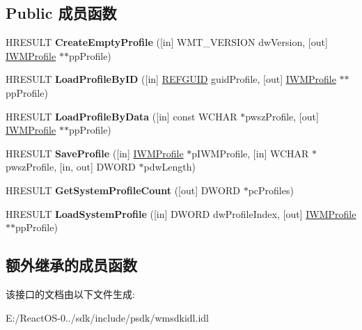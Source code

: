 \subsection*{Public 成员函数}
\begin{DoxyCompactItemize}
\item 
\mbox{\label{interface_i_w_m_profile_manager_a41ca665150d61ad72b4d442322cdad3a}} 
H\+R\+E\+S\+U\+LT {\bfseries Create\+Empty\+Profile} (\mbox{[}in\mbox{]} W\+M\+T\+\_\+\+V\+E\+R\+S\+I\+ON dw\+Version, \mbox{[}out\mbox{]} \hyperlink{interface_i_w_m_profile}{I\+W\+M\+Profile} $\ast$$\ast$pp\+Profile)
\item 
\mbox{\label{interface_i_w_m_profile_manager_add40417b8d48e9f634513dd1c2651208}} 
H\+R\+E\+S\+U\+LT {\bfseries Load\+Profile\+By\+ID} (\mbox{[}in\mbox{]} \hyperlink{struct___g_u_i_d}{R\+E\+F\+G\+U\+ID} guid\+Profile, \mbox{[}out\mbox{]} \hyperlink{interface_i_w_m_profile}{I\+W\+M\+Profile} $\ast$$\ast$pp\+Profile)
\item 
\mbox{\label{interface_i_w_m_profile_manager_a225f53283f97b715ba00a0b001d64abe}} 
H\+R\+E\+S\+U\+LT {\bfseries Load\+Profile\+By\+Data} (\mbox{[}in\mbox{]} const W\+C\+H\+AR $\ast$pwsz\+Profile, \mbox{[}out\mbox{]} \hyperlink{interface_i_w_m_profile}{I\+W\+M\+Profile} $\ast$$\ast$pp\+Profile)
\item 
\mbox{\label{interface_i_w_m_profile_manager_adefabb29481e7e334b9cd97396094dd6}} 
H\+R\+E\+S\+U\+LT {\bfseries Save\+Profile} (\mbox{[}in\mbox{]} \hyperlink{interface_i_w_m_profile}{I\+W\+M\+Profile} $\ast$p\+I\+W\+M\+Profile, \mbox{[}in\mbox{]} W\+C\+H\+AR $\ast$pwsz\+Profile, \mbox{[}in, out\mbox{]} D\+W\+O\+RD $\ast$pdw\+Length)
\item 
\mbox{\label{interface_i_w_m_profile_manager_a48d9981896b95b1a98e5e8c5f09bdfe2}} 
H\+R\+E\+S\+U\+LT {\bfseries Get\+System\+Profile\+Count} (\mbox{[}out\mbox{]} D\+W\+O\+RD $\ast$pc\+Profiles)
\item 
\mbox{\label{interface_i_w_m_profile_manager_a3778400b29db320ff6e0f1e7d0970c02}} 
H\+R\+E\+S\+U\+LT {\bfseries Load\+System\+Profile} (\mbox{[}in\mbox{]} D\+W\+O\+RD dw\+Profile\+Index, \mbox{[}out\mbox{]} \hyperlink{interface_i_w_m_profile}{I\+W\+M\+Profile} $\ast$$\ast$pp\+Profile)
\end{DoxyCompactItemize}
\subsection*{额外继承的成员函数}


该接口的文档由以下文件生成\+:\begin{DoxyCompactItemize}
\item 
E\+:/\+React\+O\+S-\/0../sdk/include/psdk/wmsdkidl.\+idl\end{DoxyCompactItemize}
